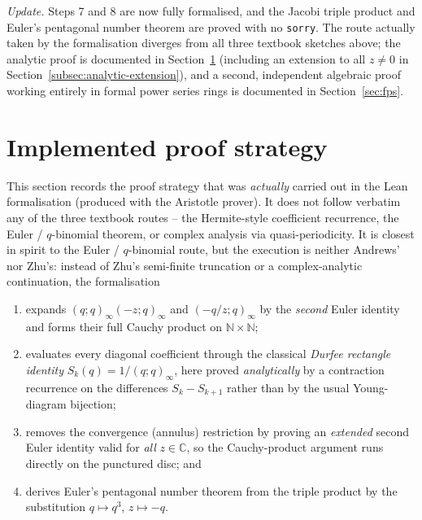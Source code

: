 \medskip
\noindent\emph{Update.} Steps 7 and 8 are now fully formalised, and the Jacobi
triple product and Euler's pentagonal number theorem are proved with no
\texttt{sorry}. The route actually taken by the formalisation diverges from all
three textbook sketches above; the analytic proof is documented in
Section~\ref{sec:implemented} (including an extension to all $z \neq 0$ in
Section~\ref{subsec:analytic-extension}), and a second, independent algebraic
proof working entirely in formal power series rings is documented in
Section~\ref{sec:fps}.


\section{Implemented proof strategy}
\label{sec:implemented}

This section records the proof strategy that was \emph{actually} carried out in
the Lean formalisation (produced with the Aristotle prover). It does not follow
verbatim any of the three textbook routes -- the Hermite-style coefficient
recurrence, the Euler / $q$-binomial theorem, or complex analysis via
quasi-periodicity. It is closest in spirit to the Euler / $q$-binomial route, but the
execution is neither Andrews' nor Zhu's: instead of Zhu's semi-finite
truncation or a complex-analytic continuation, the formalisation

\begin{enumerate}
  \item expands $(q;q)_\infty(-z;q)_\infty$ and $(-q/z;q)_\infty$ by the
    \emph{second} Euler identity and forms their full Cauchy product on
    $\mathbb{N}\times\mathbb{N}$;
  \item evaluates every diagonal coefficient through the classical
    \emph{Durfee rectangle identity} $S_k(q) = 1/(q;q)_\infty$, here proved
    \emph{analytically} by a contraction recurrence on the differences
    $S_k - S_{k+1}$ rather than by the usual Young-diagram bijection;
  \item removes the convergence (annulus) restriction by proving an
    \emph{extended} second Euler identity valid for \emph{all} $z\in\mathbb{C}$,
    so the Cauchy-product argument runs directly on the punctured disc; and
  \item derives Euler's pentagonal number theorem from the triple product by the
    substitution $q\mapsto q^3$, $z\mapsto -q$.
\end{enumerate}

